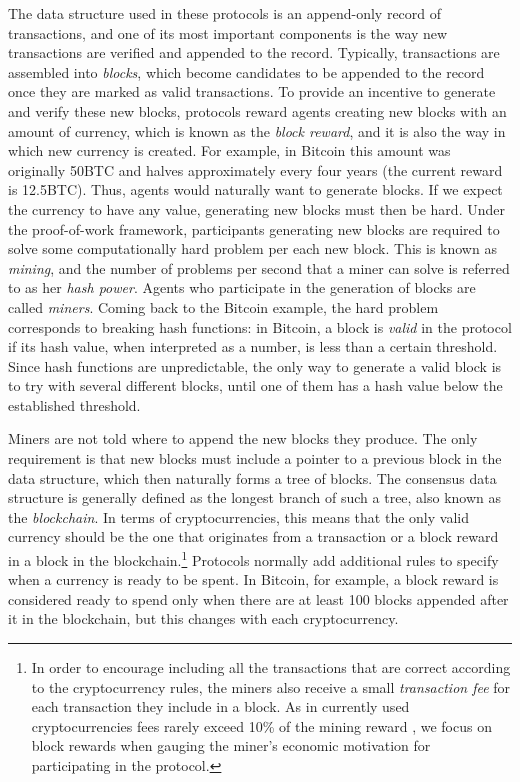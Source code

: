 The data structure used in these protocols is an append-only record of transactions, and one of its most important components is the way new transactions 
are  verified and appended to the record. Typically, transactions are assembled into \emph{blocks}, which become candidates to be appended to the record once they are 
marked as valid transactions. 
To provide an incentive to generate and verify these new blocks, protocols reward agents creating new blocks with an amount of currency, which is known as the \emph{block reward}, and it is also the way in which new currency is created. For example, in Bitcoin this amount was originally 50BTC and halves approximately every four years (the current reward is 12.5BTC). 
Thus, agents would naturally want to generate blocks. If we expect the currency to have any value, generating new blocks must then be hard. Under the proof-of-work framework, participants generating new blocks are required to solve some computationally hard problem per each new block.  This is known as \emph{mining}, and the number of problems per second that a miner can solve is referred to as her \emph{hash power}. Agents who participate in the generation of blocks are called \emph{miners}. Coming back to the Bitcoin example, the hard problem corresponds to breaking hash functions: 
in Bitcoin, a block is \emph{valid} in the protocol if its hash value, when interpreted as a number, is less than a certain threshold. Since hash functions are unpredictable, the only way to generate a valid block is to try with several different blocks, until one of them has a hash value below the established threshold. 



Miners are not told where to append the new blocks they produce. The only requirement is that new blocks must include a pointer to a previous block in the data structure, 
which then naturally forms a tree of blocks. The consensus data structure is generally defined as the longest branch of such a tree, also known as the \emph{blockchain}. 
In terms of cryptocurrencies, this means that the only valid currency should be the one that originates from a transaction or a block reward in a block in the blockchain.\footnote{In order to encourage including all the transactions that are correct according to the cryptocurrency rules, the miners also receive a small {\em transaction fee} for each transaction they include in a block. As in currently used cryptocurrencies fees rarely exceed 10\% of the mining reward \cite{TotalMiningRevenue,TotalMiningFees}, we focus on block rewards when gauging the miner's economic motivation for participating in the protocol.}
Protocols normally add additional rules to specify when a currency is ready to be spent. In Bitcoin, for example, a block reward is considered ready to spend only when there are 
at least 100 blocks appended after it in the blockchain, but this changes with each cryptocurrency.

